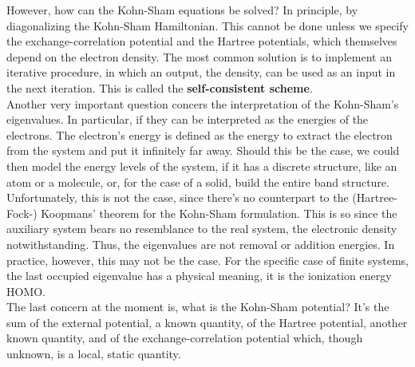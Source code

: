 \documentclass{homework}
\begin{document}
However, how can the Kohn-Sham equations be solved? In principle, by diagonalizing the Kohn-Sham Hamiltonian. This cannot be done unless we specify the exchange-correlation potential and the Hartree potentials, which themselves depend on the electron density. The most common solution is to implement an iterative procedure, in which an output, the density, can be used as an input in the next iteration. This is called the \textbf{self-consistent scheme}. \\

Another very important question concers the interpretation of the Kohn-Sham's eigenvalues. In particular, if they can be interpreted as the energies of the electrons. The electron's energy is defined as the energy to extract the electron from the system and put it infinitely far away. Should this be the case, we could then model the energy levels of the system, if it has a discrete structure, like an atom or a molecule, or, for the case of a solid, build the entire band structure. Unfortunately, this is not the case, since there's no counterpart to the (Hartree-Fock-) Koopmans' theorem for the Kohn-Sham formulation. This is so since the auxiliary system bears no resemblance to the real system, the electronic density notwithstanding. Thus, the eigenvalues are not removal or addition energies. In practice, however, this may not be the case. For the specific case of finite systems, the last occupied eigenvalue has a physical meaning, it is the ionization energy HOMO. \\

The last concern at the moment is, what is the Kohn-Sham potential? It's the sum of the external potential, a known quantity, of the Hartree potential, another known quantity, and of the exchange-correlation potential which, though unknown, is a local, static quantity. 
\end{document}
